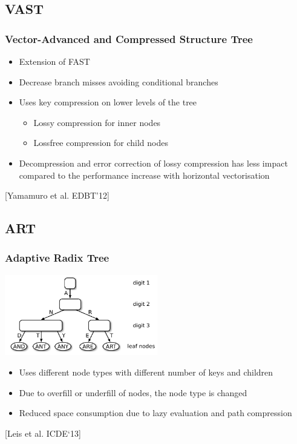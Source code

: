 \documentclass{beamer}
\begin{document}
\subsection{VAST}
\begin{frame}
	\frametitle{Vector-Advanced and Compressed Structure Tree}
	\begin{itemize}
		\item Extension of FAST
		\item Decrease branch misses avoiding conditional branches
		\item Uses key compression on lower levels of the tree
		\begin{itemize}
			\item Lossy compression for inner nodes
			\item Lossfree compression for child nodes
		\end{itemize}
		\item  Decompression and error correction of lossy compression has less impact compared to the performance increase with horizontal vectorisation 
	\end{itemize}
	\vspace*{\fill}
	\begin{center}
		\tiny [Yamamuro et al. EDBT’12]
	\end{center}
\end{frame}

\subsection{ART}
\begin{frame}
	\frametitle{Adaptive Radix Tree}
	\begin{center}
		\includegraphics[width=0.5\textwidth]{img/art2.pdf}
	\end{center}
	\begin{itemize}
		\item Uses different node types with different number of keys and children
		\item Due to overfill or underfill of nodes, the node type is changed
		\item Reduced space consumption due to lazy evaluation and path compression
	\end{itemize}
	\begin{center}
		 \tiny [Leis et al.  ICDE`13]
	\end{center}

\end{frame}
\end{document}
